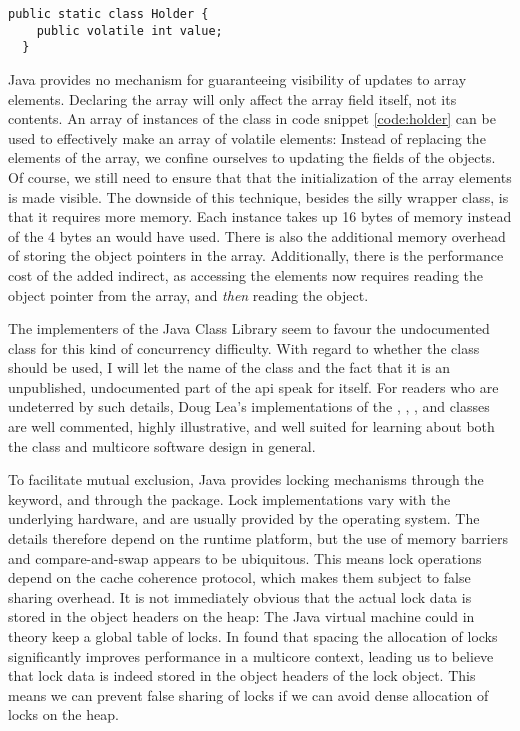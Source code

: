 \begin{code}
\begin{Verbatim}[frame=single]
  public static class Holder {
    public volatile int value;
  }
\end{Verbatim}
	\caption{}
	\label{code:holder}
\end{code}

Java provides no mechanism for guaranteeing visibility of updates to array
elements. Declaring the array  will only affect the array field
itself, not its contents. An array of instances of the  class in
code snippet \ref{code:holder} can be used to effectively make an array of
volatile elements: Instead of replacing the elements of the array, we confine
ourselves to updating the   fields of the
 objects. Of course, we still need to ensure that that the
initialization of the array elements is made visible. The downside of this
technique, besides the silly wrapper class, is that it requires more memory.
Each  instance takes up 16 bytes of memory instead of the 4 bytes
an  would have used. There is also the additional memory overhead of
storing the object pointers in the array. Additionally, there is the performance
cost of the added indirect, as accessing the elements now requires reading the
object pointer from the array, and \textit{then} reading the object.

The implementers of the Java Class Library seem to favour the undocumented
 class for this kind of concurrency difficulty. With
regard to whether the  class should be used, I will
let the name of the class and the fact that it is an unpublished, undocumented part
of the api speak for itself. For readers who are undeterred by such details,
Doug Lea's implementations of the  \cite{atomicintegersrc},
 \cite{atomicinterarraysrc},
 \cite{longaddersrc}, and  \cite{striped64src}
classes are well commented, highly illustrative, and well suited for learning
about both the  class and multicore software design in
general.

To facilitate mutual exclusion, Java provides locking mechanisms through the
 keyword, and through the 
package. Lock implementations vary with the underlying hardware, and are usually
provided by the operating system. The details therefore depend on the runtime
platform, but the use of memory barriers and compare-and-swap appears to be
ubiquitous. This means lock operations depend on the cache coherence protocol,
which makes them subject to false sharing overhead. It is not immediately
obvious that the actual lock data is stored in the object headers on the heap:
The Java virtual machine could in theory keep a global table of locks. In
\cite{mystery} \citeauthor{mystery} found that spacing the allocation of locks
significantly improves performance in a multicore context, leading us to believe
that lock data is indeed stored in the object headers of the lock object. This
means we can prevent false sharing of locks if we can avoid dense allocation of
locks on the heap.

